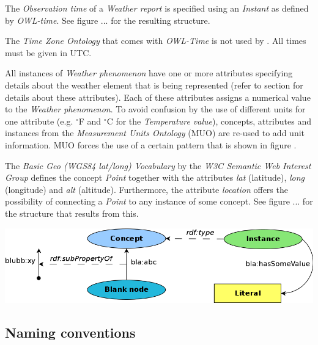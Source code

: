
The \emph{Observation time} of a \emph{Weather report} is specified using an \emph{Instant} as defined by \emph{OWL-time}. See figure ... for the resulting structure. %


The \emph{Time Zone Ontology} that comes with \emph{OWL-Time} is not used by \thinkhomeweather. All times must be given in UTC.

All instances of \emph{Weather phenomenon} have one or more attributes specifying details about the weather element that is being represented (refer to section \label{subsec:instance_attribute_tables} for details about these attributes). Each of these attributes assigns a numerical value to the \emph{Weather phenomenon}. To avoid confusion by the use of different units for one attribute (e.g. $^\circ$F and $^\circ$C for the \emph{Temperature value}), concepts, attributes and instances from the \emph{Measurement Units Ontology} (MUO) are re-used to add unit information. MUO forces the use of a certain pattern that is shown in figure . %

The \emph{Basic Geo (WGS84 lat/long) Vocabulary} by the \emph{W3C Semantic Web Interest Group} defines the concept \emph{Point} together with the attributes \emph{lat} (latitude), \emph{long} (longitude) and \emph{alt} (altitude). Furthermore, the attribute \emph{location} offers the possibility of connecting a \emph{Point} to any instance of some concept. See figure ... for the structure that results from this. %

\begin{center}
  \includegraphics[width=\textwidth]{figures/diagrams/template.png}
\end{center}


\subsection{Naming conventions}


